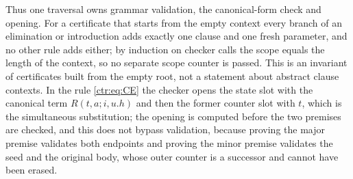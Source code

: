 Thus one traversal owns grammar validation, the canonical-form check and opening. For a
certificate that starts from the empty context every branch of an elimination or
introduction adds exactly one clause and one fresh parameter, and no other rule adds
either; by induction on checker calls the scope equals the length of the context, so no
separate scope counter is passed. This is an invariant of certificates built from the empty
root, not a statement about abstract clause contexts. In the rule \eqref{ctr:eq:CE} the
checker opens the state slot with the canonical term $R(t,a;i,u.h)$ and then the former
counter slot with $t$, which is the simultaneous substitution; the opening is computed
before the two premises are checked, and this does not bypass validation, because proving
the major premise validates both endpoints and proving the minor premise validates the seed
and the original body, whose outer counter is a successor and cannot have been erased.

